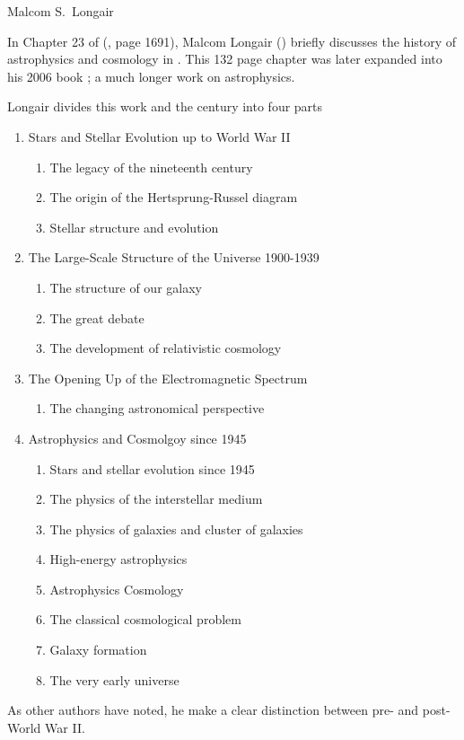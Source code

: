 
Malcom S.\ Longair

In Chapter 23 of  (\cite{Physics1995},
page 1691), Malcom Longair (\cite{Longair1995}) briefly discusses the
history of astrophysics and cosmology in .  This 132 page
chapter was later expanded into his 2006 book ;
a much longer work on  astrophysics.

Longair divides this work and the century into four parts

\begin{enumerate}
\item Stars and Stellar Evolution up to World War II
  \begin{enumerate}
  \item The legacy of the nineteenth century
  \item The origin of the Hertsprung-Russel diagram
  \item Stellar structure and evolution
  \end{enumerate}

\item The Large-Scale Structure of the Universe 1900-1939
  \begin{enumerate}
  \item The structure of our galaxy
  \item The great debate
  \item The development of relativistic cosmology
  \end{enumerate}

\item The Opening Up of the Electromagnetic Spectrum
  \begin{enumerate}
  \item The changing astronomical perspective
  \end{enumerate}

\item Astrophysics and Cosmolgoy since 1945
  \begin{enumerate}
  \item Stars and stellar evolution since 1945
  \item The physics of the interstellar medium
  \item The physics of galaxies and cluster of galaxies
  \item High-energy astrophysics
  \item Astrophysics Cosmology
  \item The classical cosmological problem
  \item Galaxy formation
  \item The very early universe
  \end{enumerate}
\end{enumerate}

As other authors have noted, he make a clear distinction between pre- and
post-World War II.
